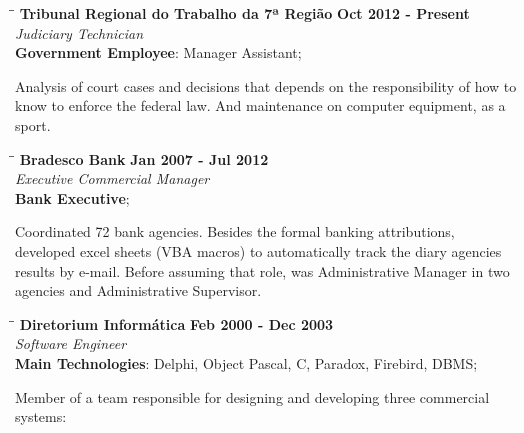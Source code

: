 \documentclass[margin]{res}
\begin{document}
\begin{resume}
\begin{tabbing}
  \hspace{2.3in}\= \hspace{1.7in}\= \kill %
  \textbf{Tribunal Regional do Trabalho da 7ª Região}    \>\>\textbf{Oct 2012 - Present}\\
  \textit{Judiciary Technician}\\
  \textbf{Government Employee}: Manager Assistant;
\end{tabbing}\vspace{-20pt}      %
\vspace{2mm} Analysis of court cases and decisions that depends on the
responsibility of how to know to enforce the federal law. And
maintenance on computer equipment, as a sport.

\begin{tabbing}
  \hspace{2.3in}\= \hspace{1.7in}\= \kill %
  \textbf{Bradesco Bank}    \>\>\textbf{Jan 2007 - Jul 2012}\\
  \textit{Executive Commercial Manager}\\
  \textbf{Bank Executive};
\end{tabbing}\vspace{-20pt}      %
\vspace{2mm} Coordinated 72 bank agencies. Besides the formal banking
attributions, developed excel sheets (VBA macros) to automatically
track the diary agencies results by e-mail. Before assuming that role,
was Administrative Manager in two agencies and Administrative
Supervisor.

\begin{tabbing}
  \hspace{2.3in}\= \hspace{1.7in}\= \kill %
  \textbf{Diretorium Informática}    \>\>\textbf{Feb 2000 - Dec 2003}\\
  \textit{Software Engineer}\\
  \textbf{Main Technologies}: Delphi, Object Pascal, C, Paradox, Firebird,
  DBMS;
\end{tabbing}\vspace{-20pt}      %
\vspace{2mm}

Member of a team responsible for designing and developing three
commercial systems:


\end{resume}
\end{document}
